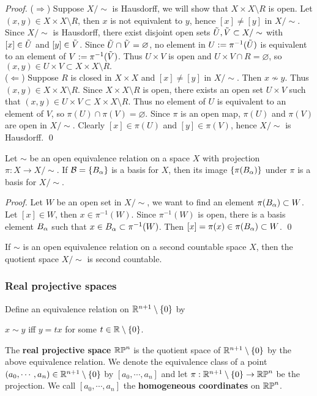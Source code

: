 \begin{proof}
    ($\Longrightarrow$) Suppose $X/\sim$ is Hausdorff, we will show that $X \times X \setminus R$ is open. Let $(x,y) \in X \times X \setminus R$, then $x$ is not equivalent to $y$, hence $[x] \neq [y]$ in $X/\sim$.
    Since $X/\sim$ is Hausdorff, there exist disjoint open sets $\Tilde{U}, \Tilde{V} \subset X/\sim$ with $[x] \in \Tilde{U}$ and $[y] \in \Tilde{V}$. Since $\Tilde{U} \cap \Tilde{V} = \varnothing$, no element in $U := \pi^{-1}(\Tilde{U})$ is equivalent to an element of $V:= \pi^{-1}(\Tilde{V})$. Thus $U \times V$ is open and $U \times V \cap R = \varnothing$, so $(x,y) \in U \times V \subset X \times X \setminus R. $ \\
    ($\Longleftarrow$) Suppose $R$ is closed in $X \times X$ and $[x] \neq [y]$ in $X/\sim$. Then $x \nsim y$. Thus $(x,y) \in X \times X \setminus R$. Since $X \times X \setminus R$ is open, there exists an open set $U \times V$ such that $(x,y) \in U \times V \subset X \times X \setminus R$. Thus no element of $U$ is equivalent to an element of $V$, so $\pi(U) \cap \pi(V) = \varnothing$. Since $\pi$ is an open map, $\pi(U)$ and $\pi(V)$ are open in $X/\sim$. Clearly $[x] \in \pi(U)$ and $[y] \in \pi(V)$, hence $X/\sim$ is Hausdorff. \qed  
\end{proof}
\begin{theorem}
    Let $\sim$ be an open equivalence relation on a space $X$ with projection $\pi:X\to X/\sim$. If $\mathcal{B} = \{B_\alpha\}$ is a basis for $X$, then its image $\{\pi(B_\alpha)\}$ under $\pi$ is a basis for $X/\sim$.
\end{theorem}
\begin{proof}
    Let $W$ be an open set in $X/\sim$, we want to find an element $\pi(B_\alpha) \subset W$. 
    Let $[x] \in W$, then $x \in \pi^{-1}(W)$. Since $\pi^{-1}(W)$ is open, there is a basis element $B_\alpha$ such that $x \in B_\alpha \subset \pi^{-1}(W)$. Then $[x]=\pi(x) \in \pi(B_\alpha) \subset W$. \qed 
\end{proof}
\begin{corollary}
    If $\sim$ is an open equivalence relation on a second countable space $X$, then the quotient space $X/\sim$ is second countable. 
\end{corollary}

\subsubsection*{Real projective spaces}
Define an equivalence relation on $\mathbb{R}^{n+1} \setminus \{0\}$ by 
\begin{center}
    $x \sim y$ iff $y=tx$ for some $t \in \mathbb{R} \setminus \{0\}$.
\end{center}
\begin{definition}
    The \textbf{real projective space} $\mathbb{RP}^n$ is the quotient space of $\mathbb{R}^{n+1} \setminus \{0\}$ by the above equivalence relation. We denote the equivalence class of a point $(a_0, \cdots, a_n) \in \mathbb{R}^{n+1}\setminus \{0\}$ by $[a_0, \cdots, a_n]$ and let 
    $\pi: \mathbb{R}^{n+1}\setminus \{0\} \to \mathbb{RP}^n$ be the projection. 
    We call $[a_0, \cdots, a_n]$ the \textbf{homogeneous coordinates} on $\mathbb{RP}^n$. 
\end{definition}

